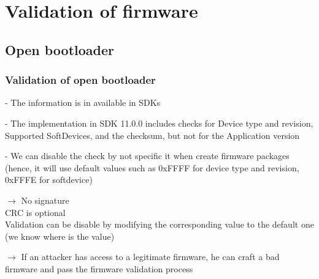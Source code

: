 \documentclass[34pt]{beamer}
\begin{document}
	\section{Validation of firmware}
	\subsection{Open bootloader}
	\begin{frame}
		\frametitle{Validation of open bootloader}
		- The information is in available in SDKs
		
		\vspace{0.3cm}
		- The implementation in SDK 11.0.0 includes checks for Device type and revision, Supported SoftDevices, and the checksum, but not for the Application version
		
		\vspace{0.3cm}
		- We can disable the check by not specific it when create
		firmware packages (hence, it will use default values such as 0xFFFF for device type and revision, 0xFFFE for softdevice)
		
		\vspace{0.3cm}
		\pause$\longrightarrow$ No signature\\
		\quad \quad CRC is optional\\
		\quad \quad Validation can be disable by modifying the corresponding value to the default one (we know where is the value)
		
		\vspace{0.3cm}
		\pause$ \longrightarrow $ If an attacker has access to a legitimate firmware, he can craft a bad firmware and pass the firmware validation process
	\end{frame}
	
\end{document}
